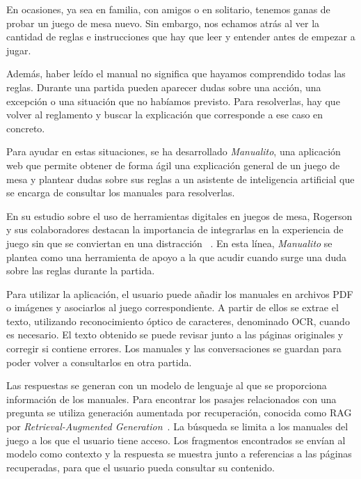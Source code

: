 
En ocasiones, ya sea en familia, con amigos o en solitario, tenemos ganas de
probar un juego de mesa nuevo. Sin embargo, nos echamos atrás al ver la
cantidad de reglas e instrucciones que hay que leer y entender antes de
empezar a jugar.

Además, haber leído el manual no significa que hayamos comprendido todas las
reglas. Durante una partida pueden aparecer dudas sobre una acción, una
excepción o una situación que no habíamos previsto. Para resolverlas, hay que
volver al reglamento y buscar la explicación que corresponde a ese
caso en concreto.

Para ayudar en estas situaciones, se ha desarrollado \textit{Manualito},
una aplicación web que permite obtener de forma ágil una explicación
general de un juego de mesa y plantear dudas sobre sus reglas a un
asistente de inteligencia artificial que se encarga de consultar los
manuales para resolverlas.

En su estudio sobre el uso de herramientas digitales en juegos de mesa,
Rogerson y sus colaboradores destacan la importancia de integrarlas en la
experiencia de juego sin que se conviertan en una distracción
~\cite{rogerson2021gimmick}. En esta línea,
\textit{Manualito} se plantea como una herramienta de apoyo a la que
acudir cuando surge una duda sobre las reglas durante la partida.

Para utilizar la aplicación, el usuario puede añadir los manuales en archivos
\acs{PDF} o imágenes y asociarlos al juego correspondiente. A partir de
ellos se extrae el texto, utilizando reconocimiento óptico de caracteres,
denominado \acs{OCR}, cuando es necesario. El texto obtenido se
puede revisar junto a las páginas originales y corregir si contiene errores.
Los manuales y las conversaciones se guardan para poder volver a consultarlos
en otra partida.

Las respuestas se generan con un modelo de lenguaje al que se proporciona
información de los manuales. Para encontrar los pasajes relacionados con una
pregunta se utiliza generación aumentada por recuperación, conocida como
\acs{RAG} por \emph{Retrieval-Augmented Generation}~\cite{lewis2020rag}.
La búsqueda se limita a los manuales del juego a los que el usuario tiene
acceso. Los fragmentos encontrados se envían al modelo como contexto y la
respuesta se muestra junto a referencias a las páginas recuperadas, para que
el usuario pueda consultar su contenido.

